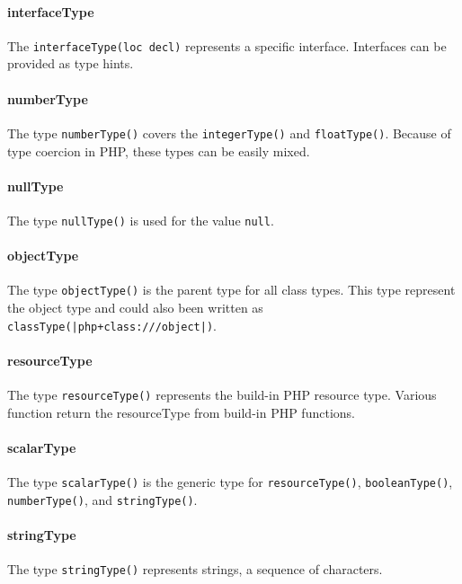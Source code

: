 \documentclass[../main.tex]{subfiles}
\begin{document}
    \paragraph{interfaceType}
    The \texttt{interfaceType(loc decl)} represents a specific interface.
    Interfaces can be provided as type hints.
    
    \paragraph{numberType}
    The type \texttt{numberType()} covers the \texttt{integerType()} and \texttt{floatType()}.
    Because of type coercion in PHP, these types can be easily mixed.
    
    \paragraph{nullType}
    The type \texttt{nullType()} is used for the value \texttt{null}.
    
    \paragraph{objectType}
    The type \texttt{objectType()} is the parent type for all class types.
    This type represent the object type and could also been written as \texttt{classType(|php+class:///object|)}.
    
    \paragraph{resourceType}
    The type \texttt{resourceType()} represents the build-in PHP resource type.
    Various function return the resourceType from build-in PHP functions.
    
    \paragraph{scalarType}
    The type \texttt{scalarType()} is the generic type for \texttt{resourceType()}, \texttt{booleanType()}, \texttt{numberType()}, and \texttt{stringType()}.
    
    \paragraph{stringType}
    The type \texttt{stringType()} represents strings, a sequence of characters.
    
    \pagebreak
    
\end{document}
